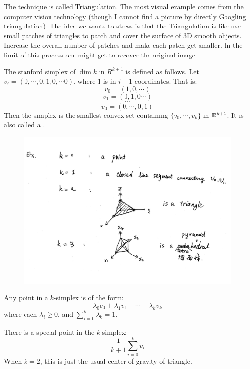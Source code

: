 The technique is called Triangulation. The most visual example comes
from the computer vision technology (though I cannot find a picture by
directly Googling triangulation). The idea we wants to stress is that
the Triangulation is like use small patches of triangles to patch and
cover the surface of 3D smooth objects. Increase the overall number of
patches and make each patch get smaller. In the limit of this process
one might get to recover the original image.

\begin{defi}
    The stanford simplex of $\dim k$ in $R^{k+1}$ is defined as
    follows. Let $v_i=(0,\cdots,0,1,0,\cdots 0)$, where $1$ is in $i+1$
    coordinates. That is:
    $$ v_0=(1,0,\cdots)$$
    $$ v_1=(0,1,0\cdots)$$
    $$\cdots$$
    $$ v_0=(0,\cdots,0,1)$$
    Then the simplex is the smallest convex set containing
    $\{v_0,\cdots,v_k\}$ in $\mathbb{R}^{k+1}$. It is also called a
    .
\end{defi}
\begin{ex}
    \begin{figure}[H]
        \centering
        \includegraphics[width=0.8\linewidth]{pics/ch6-scanned-notes-1/ex3.pdf}
    \end{figure}
\end{ex}
\begin{fact}
    Any point in a $k$-simplex is of the form:
    \begin{equation}
        \lambda_0 v_0 + \lambda_1 v_1 + \cdots + \lambda_k v_k
    \end{equation}
    where each $\lambda_i\geq 0$, and $\sum_{i=0}^{k} \lambda_k=1$.
\end{fact}
\begin{ex}
    There is a special point in the $k$-simplex:
    \begin{equation}
        \frac{1}{k+1} \sum_{i=0}^k v_i
    \end{equation}
    When $k=2$, this is just the usual center of gravity of triangle.
\end{ex}

